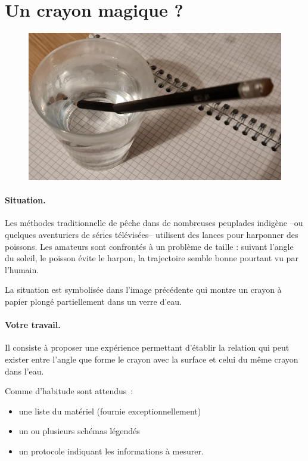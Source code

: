 \documentclass[12pt,a4paper]{article}
\begin{document}
\section{Un crayon magique ?}
\begin{figure}
	\centering
	\includegraphics{crayon-magique.jpg}
\end{figure}
\paragraph*{Situation.}
Les méthodes traditionnelle de pêche dans de nombreuses peuplades indigène --ou quelques aventuriers de séries télévisées-- utilisent des lances pour harponner des poissons. 
Les amateurs sont confrontés à un problème de taille : suivant l'angle du soleil, le poisson évite le harpon, la trajectoire semble bonne pourtant vu par l'humain.

La situation est symbolisée dans l'image précédente qui montre un crayon à papier plongé partiellement dans un verre d'eau.

\paragraph*{Votre travail.}
Il consiste à proposer une expérience permettant d'établir la relation qui peut exister entre l'angle que forme le crayon avec la surface et celui du même crayon dans l'eau.

Comme d'habitude sont attendus~:
\begin{itemize}
	\item une liste du matériel (fournie exceptionnellement)
	\item un ou plusieurs schémas légendés
	\item un protocole indiquant les informations à mesurer.
\end{itemize}
\end{document}

